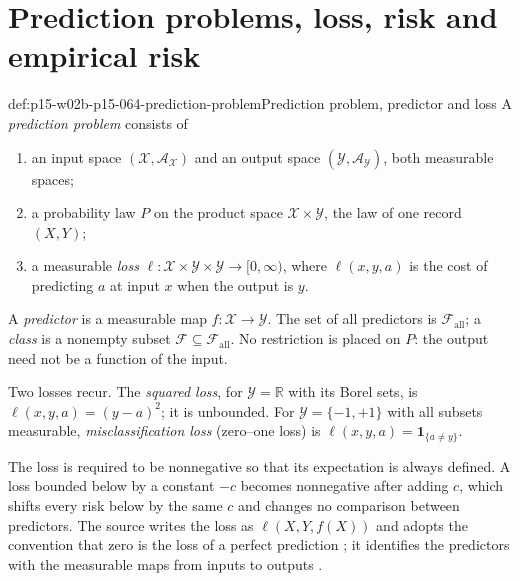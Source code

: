 \section{Prediction problems, loss, risk and empirical risk}
\label{sec:p15-w02b-p15-064-loss-risk}

\begin{hbdefinition}{def:p15-w02b-p15-064-prediction-problem}{Prediction problem, predictor and loss}
A \emph{prediction problem} consists of
\begin{enumerate}
\item an input space \((\mathcal X,\mathcal A_{\mathcal X})\) and an output
      space \((\mathcal Y,\mathcal A_{\mathcal Y})\), both measurable spaces;
\item a probability law \(P\) on the product space
      \(\mathcal X\times\mathcal Y\), the law of one record \((X,Y)\);
\item a measurable \emph{loss}
      \(\ell:\mathcal X\times\mathcal Y\times\mathcal Y\to[0,\infty)\),
      where \(\ell(x,y,a)\) is the cost of predicting \(a\) at input \(x\)
      when the output is \(y\).
\end{enumerate}
A \emph{predictor} is a measurable map \(f:\mathcal X\to\mathcal Y\).
The set of all predictors is \(\mathcal F_{\mathrm{all}}\); a \emph{class}
is a nonempty subset \(\mathcal F\subseteq\mathcal F_{\mathrm{all}}\).
No restriction is placed on \(P\): the output need not be a function of the
input.

Two losses recur. The \emph{squared loss}, for \(\mathcal Y=\mathbb R\)
with its Borel sets, is \(\ell(x,y,a)=(y-a)^2\); it is unbounded.
For \(\mathcal Y=\{-1,+1\}\) with all subsets measurable,
\emph{misclassification loss} (zero--one loss) is
\(\ell(x,y,a)=\mathbf1_{\{a\neq y\}}\).
\end{hbdefinition}

The loss is required to be nonnegative so that its expectation is always
defined. A loss bounded below by a constant \(-c\) becomes nonnegative after
adding \(c\), which shifts every risk below by the same \(c\) and changes no
comparison between predictors. The source writes the loss as
\(\ell(X,Y,f(X))\) and adopts the convention that zero is the loss of a
perfect prediction \cite[Section~2.2, p.~4]{LuxburgScholkopf2008Author};
it identifies the predictors with the measurable maps from inputs to
outputs \cite[Section~2.2, p.~5]{LuxburgScholkopf2008Author}.

